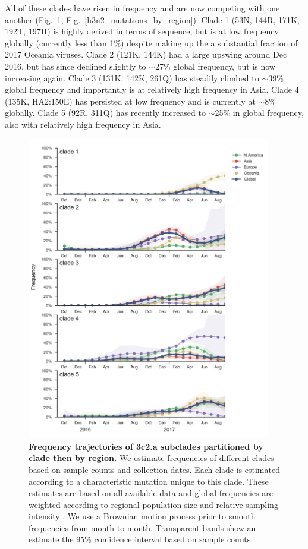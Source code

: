 \documentclass[11pt,oneside,letterpaper]{article}
\newcommand{\FIG}[1]{Fig.~\ref{#1}}
\begin{document}
All of these clades have risen in frequency and are now competing with
one another (\FIG{h3n2_mutations}, \FIG{h3n2_mutations_by_region}). Clade 1 (53N, 144R, 171K, 192T, 197H) is highly derived in
terms of sequence, but is at low frequency globally (currently less than
1\%) despite making up the a substantial fraction of 2017 Oceania
viruses.
Clade 2 (121K, 144K) had a large upswing around Dec 2016, but has since declined slightly to $\sim$27\% global frequency, but is now increasing again.
Clade 3 (131K, 142K, 261Q) has steadily climbed to $\sim$39\% global frequency and importantly is at relatively high frequency in Asia.
Clade 4 (135K, HA2:150E) has persisted at low frequency and is currently at $\sim$8\% globally.
Clade 5 (92R, 311Q) has recently increased to $\sim$25\% in global frequency, also with relatively high frequency in Asia.

\begin{figure}[h!]
  \centering
  \includegraphics[width=0.95\textwidth]{../figures/sep-2017/h3n2_mutations.png}
  \caption{\textbf{Frequency trajectories of 3c2.a subclades partitioned by clade then by region.}
  We estimate frequencies of different clades based on sample counts and collection dates.
  Each clade is estimated according to a characteristic mutation unique to this clade.
  These estimates are based on all available data and global frequencies are weighted according to regional population size and relative sampling intensity .
  We use a Brownian motion process prior to smooth frequencies from month-to-month.
  Transparent bands show an estimate the 95\% confidence interval based on sample counts.
  }
  \label{h3n2_mutations}
\end{figure}
\end{document}
